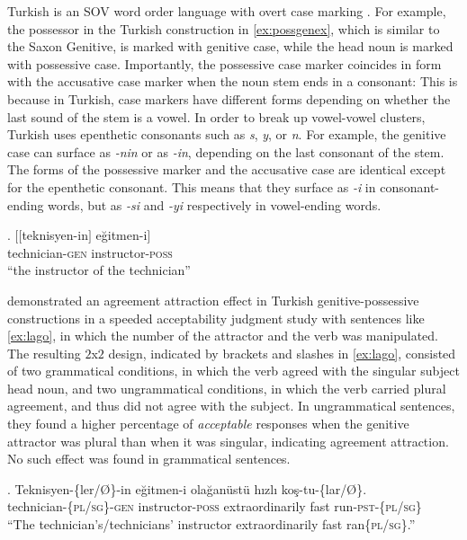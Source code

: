 \documentclass[]{interact}
\theoremstyle{plain}%
\theoremstyle{definition}
\theoremstyle{remark}
\begin{document}
Turkish is an SOV word order language with overt case marking \citep{GokselKerslake:2005,Kornfilt:2011,Kornfilt:2013}. 
For example, the possessor in the Turkish construction in \ref{ex:possgenex}, which is similar to the Saxon Genitive, is marked with genitive case, while the head noun is marked with possessive case. 
Importantly, the possessive case marker coincides in form with the accusative case marker when the noun stem ends in a consonant: 
This is because in Turkish, case markers have different forms depending on whether the last sound of the stem is a vowel. In order to break up vowel-vowel clusters, Turkish uses epenthetic consonants such as \textit{s}, \textit{y}, or \textit{n}.  For example, the genitive case can surface as \textit{-nin} or as \textit{-in}, depending on the last consonant of the stem. The forms of the possessive marker and the accusative case are identical except for the epenthetic consonant. This means that they surface as \textit{-i} in consonant-ending words, but as \textit{-si} and \textit{-yi} respectively in vowel-ending words. 

\ex. \label{ex:possgenex}
\gll $[$$[$teknisyen-in$]$ e\u{g}itmen-i$]$ \\
    technician-\textsc{gen} instructor-\textsc{poss} \\
\glt ``the instructor of the technician''


\citet{LagoEtAl:2019} demonstrated an agreement attraction effect in Turkish genitive-possessive constructions in a speeded acceptability judgment study with sentences like \ref{ex:lago}, in which the number of the attractor and the verb was manipulated. The resulting $2$x$2$ design, indicated by brackets and slashes in \ref{ex:lago}, consisted of two grammatical conditions, in which the verb agreed with the singular subject head noun, and two ungrammatical conditions, in which the verb carried plural agreement, and thus did not agree with the subject. In ungrammatical sentences, they found a higher percentage of \textit{acceptable} responses when the genitive attractor was plural than when it was singular, indicating agreement attraction. No such effect was found in grammatical sentences.


\ex. \label{ex:lago}
\gll Teknisyen-\{ler/\O\}-in e\u{g}itmen-i ola\u{g}an{\"u}st{\"u} h{\i}zl{\i} ko\c{s}-tu-\{lar/\O\}.\\
technician-\{\textsc{pl}/\textsc{sg}\}-\textsc{gen} instructor-\textsc{poss} extraordinarily fast run-\textsc{pst}-\{\textsc{pl}/\textsc{sg}\}\\
\glt ``The technician's/technicians' instructor extraordinarily fast ran\{\textsc{pl}/\textsc{sg}\}.''
\end{document}
